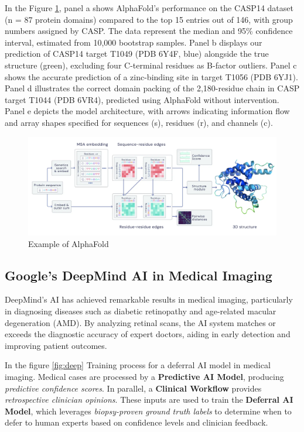 \documentclass{llncs}
\begin{document}
In the Figure \ref{fig:alpha}, panel a shows AlphaFold's performance on the CASP14 dataset (n = 87 protein domains) compared to the top 15 entries out of 146, with group numbers assigned by CASP. The data represent the median and 95\% confidence interval, estimated from 10,000 bootstrap samples. Panel b displays our prediction of CASP14 target T1049 (PDB 6Y4F, blue) alongside the true structure (green), excluding four C-terminal residues as B-factor outliers. Panel c shows the accurate prediction of a zinc-binding site in target T1056 (PDB 6YJ1). Panel d illustrates the correct domain packing of the 2,180-residue chain in CASP target T1044 (PDB 6VR4), predicted using AlphaFold without intervention. Panel e depicts the model architecture, with arrows indicating information flow and array shapes specified for sequences (s), residues (r), and channels (c).\cite{alphafoldpaperswithcode}

\begin{figure}[h!]
	\begin{center}  %
		\includegraphics[width=1\textwidth]{images/Alpha.png}
		\caption{Example of AlphaFold\cite{alphafoldpaperswithcode}}
		\label{fig:alpha}
	\end{center}
\end{figure}
\vspace{-11pt}

\subsection{Google’s DeepMind AI in Medical Imaging}
DeepMind's AI has achieved remarkable results in medical imaging, particularly in diagnosing diseases such as diabetic retinopathy and age-related macular degeneration (AMD). By analyzing retinal scans, the AI system matches or exceeds the diagnostic accuracy of expert doctors, aiding in early detection and improving patient outcomes.

In the figure \ref{fig:deep} Training process for a deferral AI model in medical imaging. Medical cases are processed by a \textbf{Predictive AI Model}, producing \textit{predictive confidence scores}. In parallel, a \textbf{Clinical Workflow} provides \textit{retrospective clinician opinions}. These inputs are used to train the \textbf{Deferral AI Model}, which leverages \textit{biopsy-proven ground truth labels} to determine when to defer to human experts based on confidence levels and clinician feedback.
\end{document}
